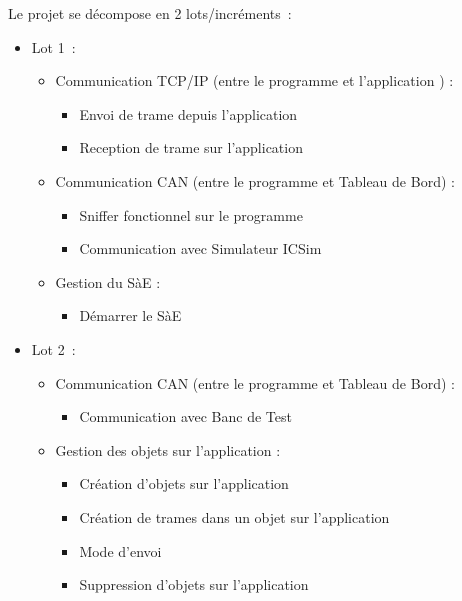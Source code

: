 
Le projet {\projet} se décompose en 2 lots/incréments~:
\begin{itemize}
    \item Lot 1~:
    \begin{itemize}
        \item Communication TCP/IP (entre le programme {\appliC} et l'application {\appliA}) :
        \begin{itemize}
            \item Envoi de trame depuis l'application {\appliA}
            \item Reception de trame sur l'application {\appliA}
        \end{itemize}
        \item Communication CAN (entre le programme {\appliC} et Tableau de Bord) :
        \begin{itemize}
            \item Sniffer fonctionnel sur le programme {\appliC}
            \item Communication avec Simulateur ICSim
        \end{itemize}
        \item Gestion du SàE :
        \begin{itemize}
            \item Démarrer le SàE
        \end{itemize}
    \end{itemize}
    \item Lot 2~:
    \begin{itemize}
        \item Communication CAN (entre le programme {\appliC} et Tableau de Bord) :
        \begin{itemize}
            \item Communication avec Banc de Test
        \end{itemize}
        \item Gestion des objets sur l'application {\appliA} :
        \begin{itemize}
            \item Création d'objets sur l'application {\appliA}
            \item Création de trames dans un objet sur l'application {\appliA}
            \item Mode d'envoi
            \item Suppression d'objets sur l'application {\appliA}

\end{itemize}
\end{itemize}
\end{itemize}
